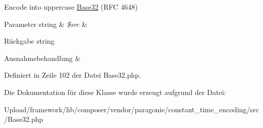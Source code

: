 Encode into uppercase \mbox{\hyperlink{class_paragon_i_e_1_1_constant_time_1_1_base32}{Base32}} (R\+FC 4648)


\begin{DoxyParams}[1]{Parameter}
string & {\em \$src} & \\
\hline
\end{DoxyParams}
\begin{DoxyReturn}{Rückgabe}
string 
\end{DoxyReturn}

\begin{DoxyExceptions}{Ausnahmebehandlung}
{\em } & \\
\hline
\end{DoxyExceptions}


Definiert in Zeile 102 der Datei Base32.\+php.



Die Dokumentation für diese Klasse wurde erzeugt aufgrund der Datei\+:\begin{DoxyCompactItemize}
\item 
Upload/framework/lib/composer/vendor/paragonie/constant\+\_\+time\+\_\+encoding/src/Base32.\+php\end{DoxyCompactItemize}
